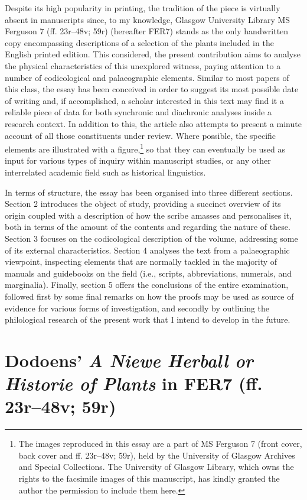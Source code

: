 \begin{paper}
Despite its high popularity in printing, the tradition of the piece is
virtually absent in manuscripts since, to my knowledge, Glasgow
University Library MS Ferguson 7 (ff. 23r--48v; 59r) (hereafter FER7)
stands as the only handwritten copy encompassing descriptions of a
selection of the plants included in the English printed edition. This
considered, the present contribution aims to analyse the physical
characteristics of this unexplored witness, paying attention to a number
of codicological and palaeographic elements. Similar to most
papers of this class, the essay has been conceived in order to
suggest its most possible date of writing and, if accomplished, a
scholar interested in this text may find it a reliable piece of data for
both synchronic and diachronic analyses inside a research context. In
addition to this, the article also attempts to present a minute
account of all those constituents under review. Where possible, the specific elements are illustrated with a figure,\footnote{The images reproduced in this essay are a part of MS Ferguson 7 (front cover, back cover and ff. 23r--48v; 59r), held by the University of Glasgow Archives and Special Collections. The University of Glasgow Library, which owns the rights to the facsimile images of this manuscript, has kindly granted the author the permission to include them here.} so
that they can eventually be used as input for various types of inquiry
within manuscript studies, or any other interrelated academic field
such as historical linguistics.

In terms of structure, the essay has been organised into three different
sections. Section 2 introduces the object of study,
providing a succinct overview of its origin coupled with a description
of how the scribe amasses and personalises it, both in terms of the
amount of the contents and regarding the nature of these. Section 3 focuses on the codicological description of the volume, addressing
some of its external characteristics. Section 4 analyses the
text from a palaeographic viewpoint, inspecting
elements that are normally tackled in the majority of manuals and
guidebooks on the field (i.e., scripts, abbreviations, numerals, and
marginalia). Finally, section 5 offers the conclusions of the
entire examination, followed first by some final remarks on how the
proofs may be used as source of evidence for various forms of investigation, and secondly by outlining the philological research
of the present work that I intend to develop in the future.

\section{Dodoens' \emph{A Niewe Herball or Historie of Plants} in FER7
(ff. 23r--48v; 59r)}


\end{paper}
